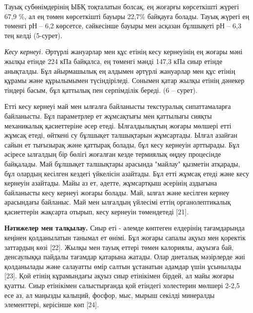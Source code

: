 \begin{multicols}{2}
Тауық субөнімдерінің ЫБҚ тоқталатын болсақ, ең жоғарғы көрсеткішті
жүрегі 67,9 \%, ал ең төмен көрсеткішті бауыры 22,7\% байқауға болады.
Тауық жүрегі ең төменгі рН -- 6,2 көрсетсе, сәйкесінше бауыры мен
асқазан бұлшықеті рН -- 6,3 тең келді (5-сурет).

\emph{Кесу кернеуі.} Әртүрлі жануарлар мен құс етінің кесу кернеуінің ең
жоғары мәні жылқы етінде 224 кПа байқалса, ең төменгі мәнді 147,3 кПа
сиыр етінде анықталды. Бұл айырмашылық ең алдымен әртүрлі жануарлар мен
құс етінің құрамы және құрылымымен түсіндіріледі. Сонымен қатар жылқы
етінің дәнекер тіндері басым, бұл қаттылық пен серпімділік береді. (6 --
сурет).

Етті кесу кернеуі май мен ылғалға байланысты текстуралық сипаттамаларға
байланысты. Бұл параметрлер ет жұмсақтығы мен қаттылығы сияқты
механикалық қасиеттеріне әсер етеді. Ылғалдылықтың жоғары мөлшері етті
жұмсақ етеді, өйткені су бұлшықет талшықтарын жұмсартады. Ылғал азайған
сайын ет тығызырақ және қаттырақ болады, бұл кесу кернеуін арттырады.
Бұл әсіресе ылғалдың бір бөлігі жоғалған кезде термиялық өңдеу
процесінде байқалады. Май бұлшықет талшықтары арасында "майлау" қызметін
атқарады, бұл олардың кесілген кездегі үйкелісін азайтады. Бұл етті
жұмсақ етеді және кесу кернеуін азайтады. Майы аз ет, әдетте, жұмсартқыш
әсерінің аздығына байланысты кесу кернеуі жоғары болады. Май, ылғал және
кесілген кернеу арасындағы байланыс. Май мен ылғалдың үйлесімі еттің
органолептикалық қасиеттерін жақсарта отырып, кесу кернеуін төмендетеді
{[}21{]}.

{\bfseries Нәтижелер мен талқылау.} Сиыр еті - әлемде көптеген елдерінің
тағамдарында кеңінен қолданылатын танымал ет өнімі. Бұл жоғары сапалы
ақуыз мен қоректік заттардың көзі {[}22{]}. Жылқы мен тауық еттері төмен
калориялы, ақуызға бай, денсаулыққа пайдалы тағамдар қатарына жатады.
Олар диеталық мәзірлерде жиі қолданылады және салауатты өмір салтын
ұстанатын адамдар үшін ұсынылады {[}23{]}. Қой етінің кұрамындағы ақуыз
сиыр етінікімен бірдей, ал майы жоғары қуатты. Сиыр етінікімен
салыстырғанда қой етіндегі холестерин мөлшері 2-2,5 есе аз, ал маңызды
калыций, фосфор, мыс, мырыш секілді минералды элементтері, керісінше көп
{[}24{]}.


\end{multicols}
